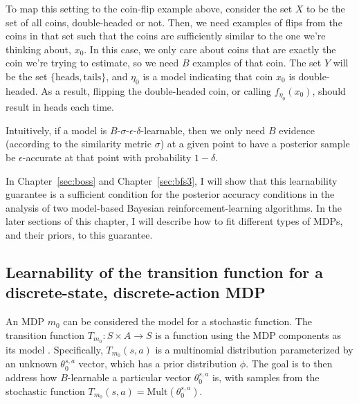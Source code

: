 To map this setting to the coin-flip example above, consider the set $X$ to be the set of all coins, double-headed or not. Then, we need examples of flips from the coins in that set such that the coins are sufficiently similar to the one we're thinking about, $x_0$. In this case, we only care about coins that are exactly the coin we're trying to estimate, so we need $B$ examples of that coin. The set $Y$ will be the set $\{\mbox{heads},\mbox{tails}\}$, and $\eta_0$ is a model indicating that coin $x_0$ is double-headed. As a result, flipping the double-headed coin, or calling $f_{\eta_0}(x_0)$, should result in heads each time.

Intuitively, if a model is $B$-$\sigma$-$\epsilon$-$\delta$-learnable, then we only need $B$ evidence (according to the similarity metric $\sigma$) at a given point to have a posterior sample be $\epsilon$-accurate at that point with probability $1-\delta$.

In Chapter~\ref{sec:boss} and Chapter~\ref{sec:bfs3}, I will show that this learnability guarantee is a sufficient condition for the posterior accuracy conditions in the analysis of two model-based Bayesian reinforcement-learning algorithms. In the later sections of this chapter, I will describe how to fit different types of MDPs, and their priors, to this guarantee.

\subsection{Learnability of the transition function for a discrete-state, discrete-action MDP}

An MDP $m_0$ can be considered the model for a stochastic function. The transition function $T_{m_0}:S \times A \rightarrow S$ is a function using the MDP components as its model . Specifically, $T_{m_0}(s,a)$ is a multinomial distribution parameterized by an unknown $\theta_0^{s,a}$ vector, which has a prior distribution $\phi$. The goal is to then address how $B$-learnable a particular vector $\theta_0^{s,a}$ is, with samples from the stochastic function $T_{m_0}(s,a) = \mbox{Mult}(\theta_0^{s,a})$.

